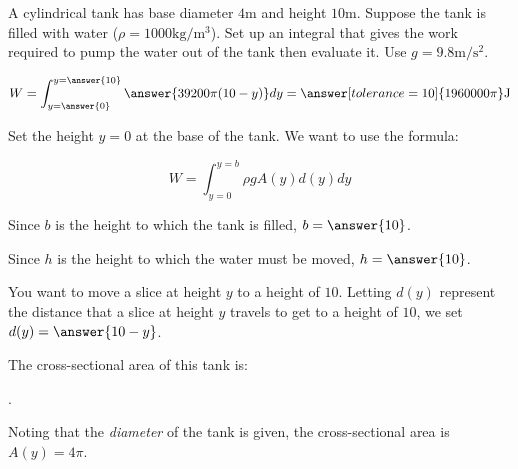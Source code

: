 \documentclass{ximera}
\author{Jim Talamo and Alex Beckwith}
\begin{document}
\begin{exercise}

A cylindrical tank has base diameter $4\mathrm{m}$ and height
$10\mathrm{m}$. Suppose the tank is filled with water ($\rho=1000
\mathrm{kg}/\mathrm{m}^3$). Set up an integral that gives the work
required to pump the water out of the tank then evaluate it.  Use
$g=9.8 \mathrm{m}/\mathrm{s}^2$.

\begin{image}
\end{image}

\[
W= \int_{y=\answer{0}}^{y=\answer{10}} \answer{39200\pi (10-y)} dy = \answer[tolerance=10]{1960000\pi} \mathrm{J}
\]
\begin{hint}
Set the height $y=0$ at the base of the tank.  We want to use the
formula:

\[ 
W = \int_{y=0}^{y=b} \rho g A(y) d(y) dy
\]

Since $b$ is the height to which the tank is filled, $b=\answer{10}$.

Since $h$ is the height to which the water must be moved,
$h=\answer{10}$.

You want to move a slice at height $y$ to a height of $10$. Letting
$d(y)$ represent the distance that a slice at height $y$ travels to
get to a height of $10$, we set $d(y) = \answer{10-y}$.

The cross-sectional area of this tank is:

\begin{multipleChoice}
.
\end{multipleChoice}

\begin{question}
Noting that the \emph{diameter} of the tank is given, the cross-sectional area is $A(y) = 4 \pi$.
\end{question}
\end{hint}
\end{exercise}
\end{document}
